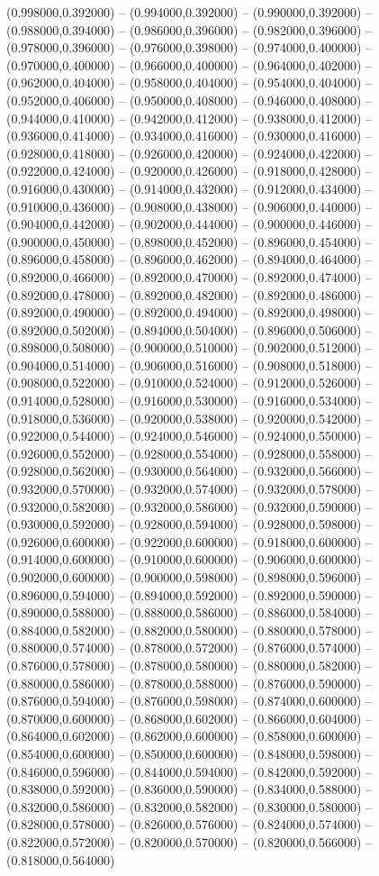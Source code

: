   (0.998000,0.392000) -- (0.994000,0.392000) -- (0.990000,0.392000) -- (0.988000,0.394000) -- (0.986000,0.396000) -- (0.982000,0.396000) -- (0.978000,0.396000) -- (0.976000,0.398000) -- (0.974000,0.400000) -- (0.970000,0.400000) -- (0.966000,0.400000) -- (0.964000,0.402000) -- (0.962000,0.404000) -- (0.958000,0.404000) -- (0.954000,0.404000) -- (0.952000,0.406000) -- (0.950000,0.408000) -- (0.946000,0.408000) -- (0.944000,0.410000) -- (0.942000,0.412000) -- (0.938000,0.412000) -- (0.936000,0.414000) -- (0.934000,0.416000) -- (0.930000,0.416000) -- (0.928000,0.418000) -- (0.926000,0.420000) -- (0.924000,0.422000) -- (0.922000,0.424000) -- (0.920000,0.426000) -- (0.918000,0.428000) -- (0.916000,0.430000) -- (0.914000,0.432000) -- (0.912000,0.434000) -- (0.910000,0.436000) -- (0.908000,0.438000) -- (0.906000,0.440000) -- (0.904000,0.442000) -- (0.902000,0.444000) -- (0.900000,0.446000) -- (0.900000,0.450000) -- (0.898000,0.452000) -- (0.896000,0.454000) -- (0.896000,0.458000) -- (0.896000,0.462000) -- (0.894000,0.464000) -- (0.892000,0.466000) -- (0.892000,0.470000) -- (0.892000,0.474000) -- (0.892000,0.478000) -- (0.892000,0.482000) -- (0.892000,0.486000) -- (0.892000,0.490000) -- (0.892000,0.494000) -- (0.892000,0.498000) -- (0.892000,0.502000) -- (0.894000,0.504000) -- (0.896000,0.506000) -- (0.898000,0.508000) -- (0.900000,0.510000) -- (0.902000,0.512000) -- (0.904000,0.514000) -- (0.906000,0.516000) -- (0.908000,0.518000) -- (0.908000,0.522000) -- (0.910000,0.524000) -- (0.912000,0.526000) -- (0.914000,0.528000) -- (0.916000,0.530000) -- (0.916000,0.534000) -- (0.918000,0.536000) -- (0.920000,0.538000) -- (0.920000,0.542000) -- (0.922000,0.544000) -- (0.924000,0.546000) -- (0.924000,0.550000) -- (0.926000,0.552000) -- (0.928000,0.554000) -- (0.928000,0.558000) -- (0.928000,0.562000) -- (0.930000,0.564000) -- (0.932000,0.566000) -- (0.932000,0.570000) -- (0.932000,0.574000) -- (0.932000,0.578000) -- (0.932000,0.582000) -- (0.932000,0.586000) -- (0.932000,0.590000) -- (0.930000,0.592000) -- (0.928000,0.594000) -- (0.928000,0.598000) -- (0.926000,0.600000) -- (0.922000,0.600000) -- (0.918000,0.600000) -- (0.914000,0.600000) -- (0.910000,0.600000) -- (0.906000,0.600000) -- (0.902000,0.600000) -- (0.900000,0.598000) -- (0.898000,0.596000) -- (0.896000,0.594000) -- (0.894000,0.592000) -- (0.892000,0.590000) -- (0.890000,0.588000) -- (0.888000,0.586000) -- (0.886000,0.584000) -- (0.884000,0.582000) -- (0.882000,0.580000) -- (0.880000,0.578000) -- (0.880000,0.574000) -- (0.878000,0.572000) -- (0.876000,0.574000) -- (0.876000,0.578000) -- (0.878000,0.580000) -- (0.880000,0.582000) -- (0.880000,0.586000) -- (0.878000,0.588000) -- (0.876000,0.590000) -- (0.876000,0.594000) -- (0.876000,0.598000) -- (0.874000,0.600000) -- (0.870000,0.600000) -- (0.868000,0.602000) -- (0.866000,0.604000) -- (0.864000,0.602000) -- (0.862000,0.600000) -- (0.858000,0.600000) -- (0.854000,0.600000) -- (0.850000,0.600000) -- (0.848000,0.598000) -- (0.846000,0.596000) -- (0.844000,0.594000) -- (0.842000,0.592000) -- (0.838000,0.592000) -- (0.836000,0.590000) -- (0.834000,0.588000) -- (0.832000,0.586000) -- (0.832000,0.582000) -- (0.830000,0.580000) -- (0.828000,0.578000) -- (0.826000,0.576000) -- (0.824000,0.574000) -- (0.822000,0.572000) -- (0.820000,0.570000) -- (0.820000,0.566000) -- (0.818000,0.564000) 